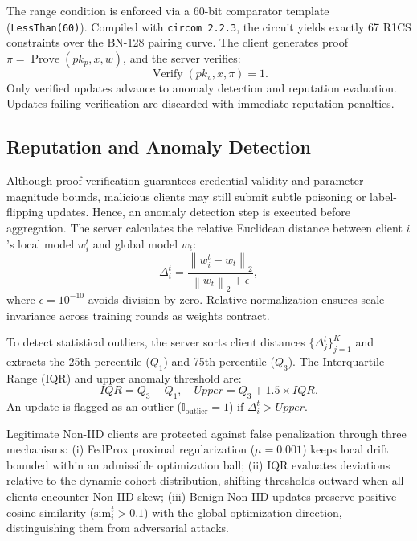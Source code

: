 \documentclass[conference, a4paper]{IEEEtran}
\begin{document}
The range condition is enforced via a 60-bit comparator template (\texttt{LessThan(60)}). Compiled with \texttt{circom 2.2.3}, the circuit yields exactly 67 R1CS constraints over the BN-128 pairing curve. The client generates proof $\pi = \operatorname{Prove}(pk_p, x, w)$, and the server verifies:
\begin{equation}
    \operatorname{Verify}(pk_v, x, \pi) = 1.
\end{equation}
Only verified updates advance to anomaly detection and reputation evaluation. Updates failing verification are discarded with immediate reputation penalties.

\subsection{Reputation and Anomaly Detection}

Although proof verification guarantees credential validity and parameter magnitude bounds, malicious clients may still submit subtle poisoning or label-flipping updates. Hence, an anomaly detection step is executed before aggregation. The server calculates the relative Euclidean distance between client $i$'s local model $w_i^t$ and global model $w_t$:
\begin{equation}
\Delta_i^t = \frac{\left\|w_i^t - w_t\right\|_2}{\left\|w_t\right\|_2 + \epsilon},
\label{eq:anomaly_distance}
\end{equation}
where $\epsilon = 10^{-10}$ avoids division by zero. Relative normalization ensures scale-invariance across training rounds as weights contract.

To detect statistical outliers, the server sorts client distances $\{\Delta_j^t\}_{j=1}^K$ and extracts the 25th percentile ($Q_1$) and 75th percentile ($Q_3$). The Interquartile Range (IQR) and upper anomaly threshold are:
\begin{equation}
IQR = Q_3 - Q_1, \quad Upper = Q_3 + 1.5 \times IQR.
\label{eq:iqr_bounds}
\end{equation}
An update is flagged as an outlier ($\mathbb{I}_{\mathrm{outlier}} = 1$) if $\Delta_i^t > Upper$. 

Legitimate Non-IID clients are protected against false penalization through three mechanisms:
(i) FedProx proximal regularization ($\mu = 0.001$) keeps local drift bounded within an admissible optimization ball;
(ii) IQR evaluates deviations relative to the dynamic cohort distribution, shifting thresholds outward when all clients encounter Non-IID skew;
(iii) Benign Non-IID updates preserve positive cosine similarity ($\mathrm{sim}_i^t > 0.1$) with the global optimization direction, distinguishing them from adversarial attacks.
\end{document}
